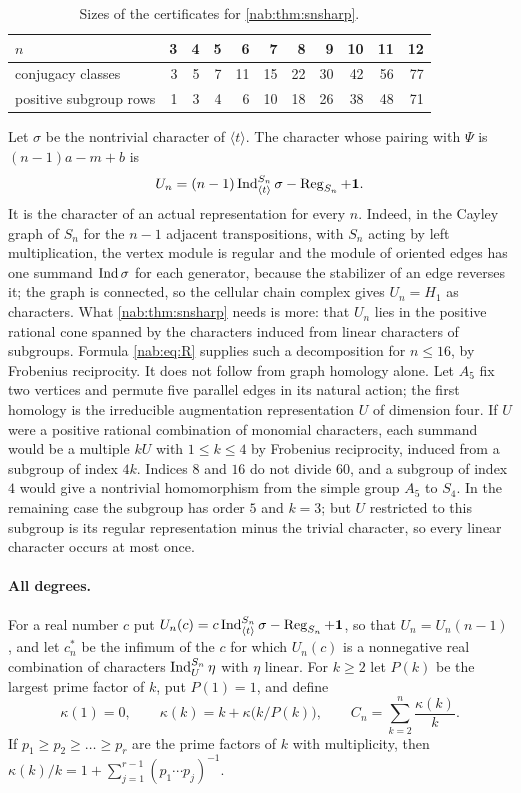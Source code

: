 \begin{table}[ht]
\centering\small
\begin{tabular}{l|rrrrrrrrrr}
$n$&3&4&5&6&7&8&9&10&11&12\\\hline
conjugacy classes&3&5&7&11&15&22&30&42&56&77\\
positive subgroup rows&1&3&4&6&10&18&26&38&48&71
\end{tabular}
\caption{Sizes of the certificates for \cref{nab:thm:snsharp}.}\label{nab:tab:rowcount}
\end{table}

\begin{remark}\label{nab:rem:un}
Let $\sigma$ be the nontrivial character of $\langle t\rangle$. The character whose
pairing with $\Psi$ is $(n-1)a-m+b$ is
\[
 U_n=(n-1)\operatorname{Ind}_{\langle t\rangle}^{S_n}\sigma-\operatorname{Reg}_{S_n}+\mathbf{1} .
\]
It is the character of an actual representation for every $n$. Indeed, in the Cayley
graph of $S_n$ for the $n-1$ adjacent transpositions, with $S_n$ acting by left
multiplication, the vertex module is regular and the module of oriented edges has one
summand $\operatorname{Ind}\sigma$ for each generator, because the stabilizer of an edge reverses it;
the graph is connected, so the cellular chain complex gives $U_n=H_1$ as characters. What
\cref{nab:thm:snsharp} needs is more: that $U_n$ lies in the positive rational cone spanned
by the characters induced from linear characters of subgroups. Formula \eqref{nab:eq:R}
supplies such a decomposition for $n\le16$, by Frobenius reciprocity. It does not follow
from graph homology alone. Let $A_5$ fix two vertices and permute five parallel edges in
its natural action; the first homology is the irreducible augmentation representation $U$
of dimension four. If $U$ were a positive rational combination of monomial characters,
each summand would be a multiple $kU$ with $1\le k\le4$ by Frobenius reciprocity, induced
from a subgroup of index $4k$. Indices $8$ and $16$ do not divide $60$, and a subgroup of
index $4$ would give a nontrivial homomorphism from the simple group $A_5$ to $S_4$. In
the remaining case the subgroup has order $5$ and $k=3$; but $U$ restricted to this
subgroup is its regular representation minus the trivial character, so every linear
character occurs at most once.
\end{remark}

\paragraph{All degrees.}
For a real number $c$ put $U_n(c)=c\operatorname{Ind}_{\langle t\rangle}^{S_n}\sigma-\operatorname{Reg}_{S_n}+\mathbf{1}$, so
that $U_n=U_n(n-1)$, and let $c_n^*$ be the infimum of the $c$ for which $U_n(c)$ is a
nonnegative real combination of characters $\operatorname{Ind}_U^{S_n}\eta$ with $\eta$ linear. For $k\ge2$
let $P(k)$ be the largest prime factor of $k$, put $P(1)=1$, and define
\begin{equation}\label{nab:eq:kappa}
 \kappa(1)=0,\qquad \kappa(k)=k+\kappa\bigl(k/P(k)\bigr),\qquad
 C_n=\sum_{k=2}^n\frac{\kappa(k)}k .
\end{equation}
If $p_1\ge p_2\ge\dots\ge p_r$ are the prime factors of $k$ with multiplicity, then
$\kappa(k)/k=1+\sum_{j=1}^{r-1}(p_1\cdots p_j)^{-1}$.

